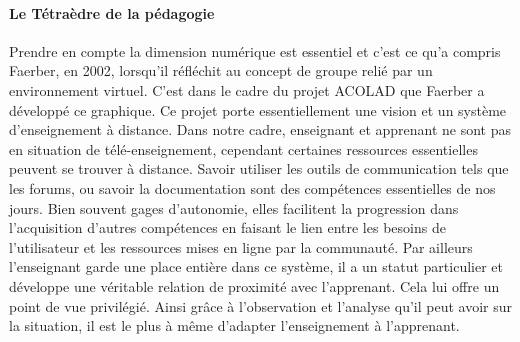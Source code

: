     \paragraph{Le Tétraèdre de la pédagogie}
        Prendre en compte la dimension numérique est essentiel et c'est ce qu’a compris Faerber, en 2002, lorsqu'il réfléchit au concept de groupe relié par un environnement virtuel.
        C'est dans le cadre du projet ACOLAD que Faerber a développé ce graphique. Ce projet porte essentiellement une vision et un système d'enseignement à distance. Dans notre cadre, enseignant et apprenant ne sont pas en situation de télé-enseignement, cependant certaines ressources essentielles peuvent se trouver à distance.
        Savoir utiliser les outils de communication tels que les forums, ou savoir  la documentation sont des compétences essentielles de nos jours. Bien souvent gages d'autonomie, elles facilitent la progression dans l'acquisition d'autres compétences en faisant le lien entre les besoins de l'utilisateur et les ressources mises en ligne par la communauté.
        Par ailleurs l'enseignant garde une place entière dans ce système, il a un statut particulier et développe une véritable relation de proximité avec l'apprenant. Cela lui offre un point de vue privilégié. Ainsi grâce à l'observation et l'analyse qu'il peut avoir sur la situation, il est le plus à même d'adapter l'enseignement à l'apprenant.
